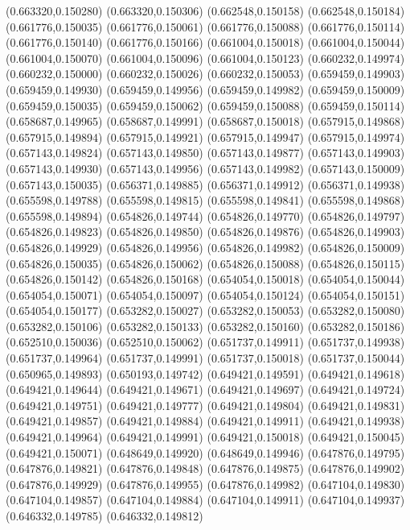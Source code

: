 (0.663320,0.150280)
(0.663320,0.150306)
(0.662548,0.150158)
(0.662548,0.150184)
(0.661776,0.150035)
(0.661776,0.150061)
(0.661776,0.150088)
(0.661776,0.150114)
(0.661776,0.150140)
(0.661776,0.150166)
(0.661004,0.150018)
(0.661004,0.150044)
(0.661004,0.150070)
(0.661004,0.150096)
(0.661004,0.150123)
(0.660232,0.149974)
(0.660232,0.150000)
(0.660232,0.150026)
(0.660232,0.150053)
(0.659459,0.149903)
(0.659459,0.149930)
(0.659459,0.149956)
(0.659459,0.149982)
(0.659459,0.150009)
(0.659459,0.150035)
(0.659459,0.150062)
(0.659459,0.150088)
(0.659459,0.150114)
(0.658687,0.149965)
(0.658687,0.149991)
(0.658687,0.150018)
(0.657915,0.149868)
(0.657915,0.149894)
(0.657915,0.149921)
(0.657915,0.149947)
(0.657915,0.149974)
(0.657143,0.149824)
(0.657143,0.149850)
(0.657143,0.149877)
(0.657143,0.149903)
(0.657143,0.149930)
(0.657143,0.149956)
(0.657143,0.149982)
(0.657143,0.150009)
(0.657143,0.150035)
(0.656371,0.149885)
(0.656371,0.149912)
(0.656371,0.149938)
(0.655598,0.149788)
(0.655598,0.149815)
(0.655598,0.149841)
(0.655598,0.149868)
(0.655598,0.149894)
(0.654826,0.149744)
(0.654826,0.149770)
(0.654826,0.149797)
(0.654826,0.149823)
(0.654826,0.149850)
(0.654826,0.149876)
(0.654826,0.149903)
(0.654826,0.149929)
(0.654826,0.149956)
(0.654826,0.149982)
(0.654826,0.150009)
(0.654826,0.150035)
(0.654826,0.150062)
(0.654826,0.150088)
(0.654826,0.150115)
(0.654826,0.150142)
(0.654826,0.150168)
(0.654054,0.150018)
(0.654054,0.150044)
(0.654054,0.150071)
(0.654054,0.150097)
(0.654054,0.150124)
(0.654054,0.150151)
(0.654054,0.150177)
(0.653282,0.150027)
(0.653282,0.150053)
(0.653282,0.150080)
(0.653282,0.150106)
(0.653282,0.150133)
(0.653282,0.150160)
(0.653282,0.150186)
(0.652510,0.150036)
(0.652510,0.150062)
(0.651737,0.149911)
(0.651737,0.149938)
(0.651737,0.149964)
(0.651737,0.149991)
(0.651737,0.150018)
(0.651737,0.150044)
(0.650965,0.149893)
(0.650193,0.149742)
(0.649421,0.149591)
(0.649421,0.149618)
(0.649421,0.149644)
(0.649421,0.149671)
(0.649421,0.149697)
(0.649421,0.149724)
(0.649421,0.149751)
(0.649421,0.149777)
(0.649421,0.149804)
(0.649421,0.149831)
(0.649421,0.149857)
(0.649421,0.149884)
(0.649421,0.149911)
(0.649421,0.149938)
(0.649421,0.149964)
(0.649421,0.149991)
(0.649421,0.150018)
(0.649421,0.150045)
(0.649421,0.150071)
(0.648649,0.149920)
(0.648649,0.149946)
(0.647876,0.149795)
(0.647876,0.149821)
(0.647876,0.149848)
(0.647876,0.149875)
(0.647876,0.149902)
(0.647876,0.149929)
(0.647876,0.149955)
(0.647876,0.149982)
(0.647104,0.149830)
(0.647104,0.149857)
(0.647104,0.149884)
(0.647104,0.149911)
(0.647104,0.149937)
(0.646332,0.149785)
(0.646332,0.149812)
